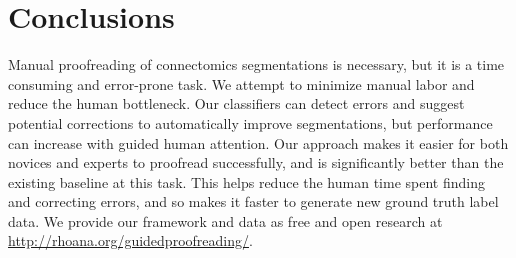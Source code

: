 \section{Conclusions}


Manual proofreading of connectomics segmentations is necessary, but it is a time consuming and error-prone task. We attempt to minimize manual labor and reduce the human bottleneck. Our classifiers can detect errors and suggest potential corrections to automatically improve segmentations, but performance can increase with guided human attention. Our approach makes it easier for both novices and experts to proofread successfully, and is significantly better than the existing baseline at this task. This helps reduce the human time spent finding and correcting errors, and so makes it faster to generate new ground truth label data. We provide our framework and data as free and open research at \url{http://rhoana.org/guidedproofreading/}.

